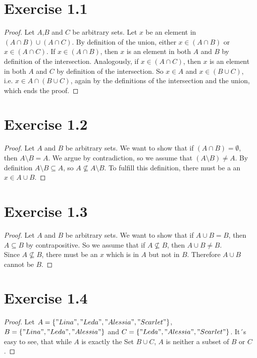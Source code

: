 \documentclass{article} %
\newcommand{\homeworkNumber}{1}
\begin{document}
\section*{Exercise \homeworkNumber.1}

\begin{proof}
Let $A$,$B$ and $C$ be arbitrary sets. Let $x$ be an element in $(A \cap B) \cup (A \cap C)$. By definition of the union, either $x \in (A \cap B)$ or $ x \in (A \cap C)$. If $x \in (A \cap B)$, then $x$ is an element in both $A$ and $B$ by definition of the intersection. Analogously, if $x \in (A \cap C)$, then $x$ is an element in both $A$ and $C$ by definition of the intersection. So $x \in A$ and $x \in (B \cup C)$, i.e. $x \in A \cap (B \cup C) $, again by the definitions of the intersection and the union, which ends the proof.

\end{proof}

\section*{Exercise \homeworkNumber.2}

\begin{proof}
Let $A$ and $B$ be arbitrary sets. We want to show that if $(A \cap B) = \emptyset$, then $A \setminus B = A$. We argue by contradiction, so we assume that $(A \setminus B) \neq A$.
By definition $A \setminus B \subseteq A$, so $A 	\not\subseteq A \setminus B$. To fulfill this definition, there must be a an $x \in A \cup B$. 


\end{proof}


\section*{Exercise \homeworkNumber.3}

\begin{proof}
Let $A$ and $B$ be arbitrary sets. We want to show that if $A \cup B = B$, then $A \subseteq B$ by contrapositive. So we assume that if $A \not\subseteq B$, then $A \cup B \neq B$.\\
Since $A \not\subseteq B$, there must be an $x$ which is in $A$ but not in $B$. Therefore $A \cup B$ cannot be $B$.


\end{proof}

\section*{Exercise \homeworkNumber.4}

\begin{proof}
Let $A = \{"Lina", "Leda", "Alessia", "Scarlet"\}$, $B = \{"Lina", "Leda", "Alessia"\}$ and \linebreak $C  = \{"Leda", "Alessia", "Scarlet"\}$. It´s easy to see, that while $A$ is exactly the Set $B \cup C$, $A$ is neither a subset of $B$ or $C$.

 
\end{proof}
\end{document}
